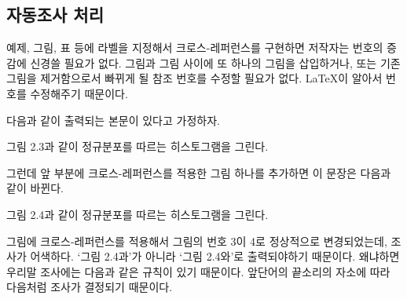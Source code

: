 \documentclass[
  letterpaper,
]{book}
\newenvironment{Shaded}{\begin{snugshade}}{\end{snugshade}}
\newcommand{\NormalTok}[1]{\textcolor[rgb]{0.00,0.23,0.31}{#1}}
\begin{document}
\hypertarget{uxc790uxb3d9uxc870uxc0ac-uxcc98uxb9ac}{%
\subsection{자동조사 처리}\label{uxc790uxb3d9uxc870uxc0ac-uxcc98uxb9ac}}

예제, 그림, 표 등에 라벨을 지정해서 크로스-레퍼런스를 구현하면 저작자는
번호의 증감에 신경쓸 필요가 없다. 그림과 그림 사이에 또 하나의 그림을
삽입하거나, 또는 기존 그림을 제거함으로서 빠뀌게 될 참조 번호를 수정할
필요가 없다. LaTeX이 알아서 번호를 수정해주기 때문이다.

다음과 같이 출력되는 본문이 있다고 가정하자.

\begin{Shaded}
\begin{Highlighting}[]
\NormalTok{그림 2.3과 같이 정규분포를 따르는 히스토그램을 그린다.}
\end{Highlighting}
\end{Shaded}

그런데 앞 부분에 크로스-레퍼런스를 적용한 그림 하나를 추가하면 이 문장은
다음과 같이 바뀐다.

\begin{Shaded}
\begin{Highlighting}[]
\NormalTok{그림 2.4과 같이 정규분포를 따르는 히스토그램을 그린다.}
\end{Highlighting}
\end{Shaded}

그림에 크로스-레퍼런스를 적용해서 그림의 번호 3이 4로 정상적으로
변경되었는데, 조사가 어색하다. `그림 2.4과'가 아니라 `그림 2.4와'로
출력되야하기 때문이다. 왜냐하면 우리말 조사에는 다음과 같은 규칙이 있기
때문이다. 앞단어의 끝소리의 자소에 따라 다음처럼 조사가 결정되기
때문이다.\autocite{kim2007}
\end{document}
